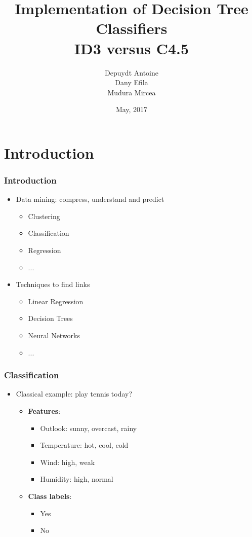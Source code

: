 \documentclass{beamer}
\title{Implementation of Decision Tree Classifiers\\
ID3 versus C4.5}
\author{Depuydt Antoine\\ Dany Efila \\Mudura Mircea}
\date{May, 2017}
\begin{document}
\maketitle


\section{Introduction}
\begin{frame}
\frametitle{Introduction}
\begin{itemize}
\item Data mining: compress, understand and predict
	\vfill
	\begin{itemize}
		\item Clustering
		\vfill
		\item Classification
		\vfill
		\item Regression
		\vfill
		\item ...
	\end{itemize}
\vfill
\item Techniques to find links
	\vfill
	\begin{itemize}
		\item Linear Regression
		\vfill
		\item Decision Trees
		\vfill
		\item Neural Networks
		\vfill
		\item ...
	\end{itemize}
\end{itemize}
\end{frame}


\begin{frame}
\frametitle{Classification}
	\begin{itemize}
		\item Classical example: play tennis today?
		\vfill
		\begin{itemize}
			\item \textbf{Features}:
			\begin{itemize}
				\item Outlook: sunny, overcast, rainy
				\vfill
				\item Temperature: hot, cool, cold
				\vfill
				\item Wind: high, weak
				\vfill
				\item Humidity: high, normal
			\end{itemize}
			\vfill
			\item \textbf{Class labels}:
				\begin{itemize}
				\item Yes
				\vfill
				\item No
				\end{itemize}			

		\end{itemize}
	\end{itemize}
\end{frame}
\end{document}
